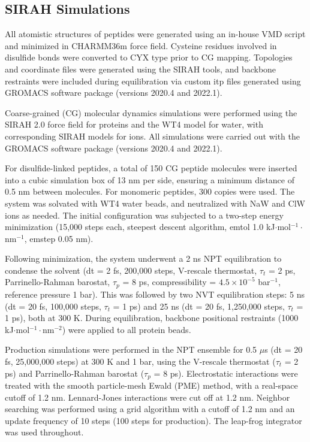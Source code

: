 \subsection{SIRAH Simulations}

All atomistic structures of peptides were generated using an in-house VMD script\cite{VMD} and minimized in CHARMM36m force field\cite{CHARMM36m}. Cysteine residues involved in disulfide bonds were converted to CYX type prior to CG mapping.
Topologies and coordinate files were generated using the SIRAH tools\cite{SIRAH2.0}, and backbone restraints were included during equilibration via custom itp files generated using GROMACS software package (versions 2020.4 and 2022.1)\cite{GROMACS,GROMACS2}.

Coarse-grained (CG) molecular dynamics simulations were performed using the SIRAH 2.0 force field for proteins\cite{SIRAH2.0} and the WT4 model for water, with corresponding SIRAH models for ions\cite{SIRAHWT}.
All simulations were carried out with the GROMACS software package (versions 2020.4 and 2022.1)\cite{GROMACS,GROMACS2}.

For disulfide-linked peptides, a total of 150 CG peptide molecules were inserted into a cubic simulation box of 13 nm per side, ensuring a minimum distance of 0.5 nm between molecules.
For monomeric peptides, 300 copies were used.
The system was solvated with WT4 water beads, and neutralized with NaW and ClW ions as needed.
The initial configuration was subjected to a two-step energy minimization (15,000 steps each, steepest descent algorithm, emtol 1.0 kJ$\cdot$mol$^{-1}\cdot$nm$^{-1}$, emstep 0.05 nm).

Following minimization, the system underwent a 2 ns NPT equilibration to condense the solvent (dt = 2 fs, 200,000 steps, V-rescale thermostat, $\tau_t$ = 2 ps, Parrinello-Rahman barostat, $\tau_p$ = 8 ps, compressibility = $4.5 \times 10^{-5}$ bar$^{-1}$, reference pressure 1 bar).
This was followed by two NVT equilibration steps: 5 ns (dt = 20 fs, 100,000 steps, $\tau_t$ = 1 ps) and 25 ns (dt = 20 fs, 1,250,000 steps, $\tau_t$ = 1 ps), both at 300 K.
During equilibration, backbone positional restraints (1000 kJ$\cdot$mol$^{-1}\cdot$nm$^{-2}$) were applied to all protein beads.

Production simulations were performed in the NPT ensemble for 0.5 $\mu$s (dt = 20 fs, 25,000,000 steps) at 300 K and 1 bar, using the V-rescale thermostat ($\tau_t$ = 2 ps) and Parrinello-Rahman barostat ($\tau_p$ = 8 ps).
Electrostatic interactions were treated with the smooth particle-mesh Ewald (PME) method\cite{PME,PMEEssmann}, with a real-space cutoff of 1.2 nm.
Lennard-Jones interactions were cut off at 1.2 nm.
Neighbor searching was performed using a grid algorithm with a cutoff of 1.2 nm and an update frequency of 10 steps (100 steps for production).
The leap-frog integrator was used throughout\cite{Leap-frog}.








